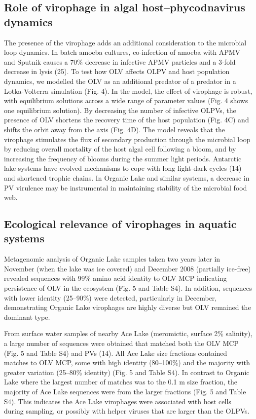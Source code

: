\subsection[Virophage in algal host--phycodnavirus dynamics]{Role of virophage in algal host--phycodnavirus dynamics}
The presence of the virophage adds an additional consideration to the microbial loop dynamics. 
In batch amoeba cultures, co-infection of amoeba with \ac{APMV} and Sputnik causes a 70\% decrease in infective \ac{APMV} particles and a 3-fold decrease in lysis (25). 
To test how \ac{OLV} affects \ac{OLPV} and host population dynamics, we modelled the \ac{OLV} as an additional predator of a predator in a Lotka-Volterra simulation (Fig. 4). 
In the model, the effect of virophage is robust, with equilibrium solutions across a wide range of parameter values (Fig. 4 shows one equilibrium solution). 
By decreasing the number of infective \acp{OLPV}, the presence of \ac{OLV} shortens the recovery time of the host population (Fig. 4C) and shifts the orbit away from the axis (Fig. 4D). 
The model reveals that the virophage stimulates the flux of secondary production through the microbial loop by reducing overall mortality of the host algal cell following a bloom, and by increasing the frequency of blooms during the summer light periods. 
Antarctic lake systems have evolved mechanisms to cope with long light-dark cycles (14) and shortened trophic chains. 
In Organic Lake and similar systems, a decrease in \ac{PV} virulence may be instrumental in maintaining stability of the microbial food web. 

\subsection{Ecological relevance of virophages in aquatic systems}
Metagenomic analysis of Organic Lake samples taken two years later in November (when the lake was ice covered) and December 2008 (partially ice-free) revealed sequences with 99\% amino acid identity to \ac{OLV} \ac{MCP} indicating persistence of \ac{OLV} in the ecosystem (Fig. 5 and Table S4). 
In addition, sequences with lower identity (25--90\%) were detected, particularly in December, demonstrating Organic Lake virophages are highly diverse but \ac{OLV} remained the dominant type. 

From surface water samples of nearby Ace Lake (meromictic, surface 2\% salinity), a large number of sequences were obtained that matched both the \ac{OLV} \ac{MCP} (Fig. 5 and Table S4) and PVs (14). 
All Ace Lake size fractions contained matches to \ac{OLV} \ac{MCP}, some with high identity (80--100\%) and the majority with greater variation (25--80\% identity) (Fig. 5 and Table S4). 
In contrast to Organic Lake where the largest number of matches was to the 0.1 \textmu{}m size fraction, the majority of Ace Lake sequences were from the larger fractions (Fig. 5 and Table S4). 
This indicates the Ace Lake virophages were associated with host cells during sampling, or possibly with helper viruses that are larger than the \acp{OLPV}. 

